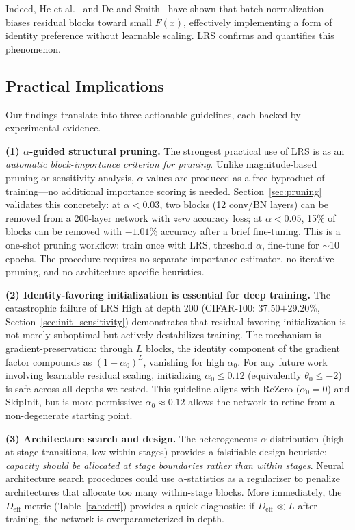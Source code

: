\documentclass[preprint,12pt]{elsarticle}
\begin{document}
Indeed, He et al.~\cite{he2016identity} and De and Smith~\cite{de2020batch} have shown that batch normalization biases residual blocks toward small $F(x)$, effectively implementing a form of identity preference without learnable scaling. LRS confirms and quantifies this phenomenon.

\subsection{Practical Implications}
\label{sec:practical_implications}

Our findings translate into three actionable guidelines, each backed by experimental evidence.

\textbf{(1) $\alpha$-guided structural pruning.} The strongest practical use of LRS is as an \emph{automatic block-importance criterion for pruning}. Unlike magnitude-based pruning or sensitivity analysis, $\alpha$ values are produced as a free byproduct of training---no additional importance scoring is needed. Section~\ref{sec:pruning} validates this concretely: at $\alpha < 0.03$, two blocks (12 conv/BN layers) can be removed from a 200-layer network with \emph{zero} accuracy loss; at $\alpha < 0.05$, 15\% of blocks can be removed with $-1.01\%$ accuracy after a brief fine-tuning. This is a one-shot pruning workflow: train once with LRS, threshold $\alpha$, fine-tune for $\sim$10 epochs. The procedure requires no separate importance estimator, no iterative pruning, and no architecture-specific heuristics.

\textbf{(2) Identity-favoring initialization is essential for deep training.} The catastrophic failure of LRS High at depth 200 (CIFAR-100: 37.50$\pm$29.20\%, Section~\ref{sec:init_sensitivity}) demonstrates that residual-favoring initialization is not merely suboptimal but actively destabilizes training. The mechanism is gradient-preservation: through $L$ blocks, the identity component of the gradient factor compounds as $(1{-}\alpha_0)^L$, vanishing for high $\alpha_0$. For any future work involving learnable residual scaling, initializing $\alpha_0 \leq 0.12$ (equivalently $\theta_0 \leq -2$) is safe across all depths we tested. This guideline aligns with ReZero ($\alpha_0 = 0$) and SkipInit, but is more permissive: $\alpha_0 \approx 0.12$ allows the network to refine from a non-degenerate starting point.

\textbf{(3) Architecture search and design.} The heterogeneous $\alpha$ distribution (high at stage transitions, low within stages) provides a falsifiable design heuristic: \emph{capacity should be allocated at stage boundaries rather than within stages}. Neural architecture search procedures could use $\alpha$-statistics as a regularizer to penalize architectures that allocate too many within-stage blocks. More immediately, the $D_\text{eff}$ metric (Table~\ref{tab:deff}) provides a quick diagnostic: if $D_\text{eff} \ll L$ after training, the network is overparameterized in depth.
\end{document}
